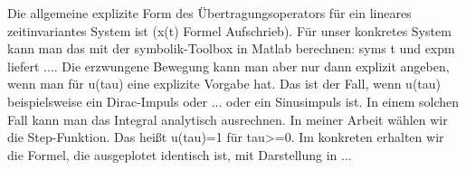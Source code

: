 Die allgemeine explizite Form des Übertragungsoperators für ein lineares zeitinvariantes System ist (x(t) Formel Aufschrieb).
Für unser konkretes System kann man das mit der symbolik-Toolbox in Matlab berechnen: syms t und expm liefert ....
Die erzwungene Bewegung kann man aber nur dann explizit angeben, wenn man für u(tau) eine explizite Vorgabe hat. Das ist der Fall, wenn u(tau) beispielsweise ein Dirac-Impuls oder ... 
oder ein Sinusimpuls ist. In einem solchen Fall kann man das Integral analytisch ausrechnen. In meiner Arbeit wählen wir die Step-Funktion. 
Das heißt u(tau)=1 für tau>=0. Im konkreten erhalten wir die Formel, die ausgeplotet identisch ist, mit Darstellung in ...